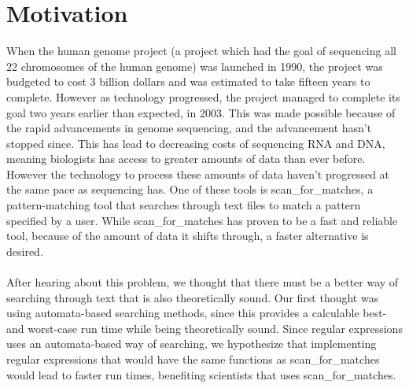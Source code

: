 \section{Motivation}
When the human genome project (a project which had the goal of sequencing 
all 22 chromosomes of the human genome) was launched in 1990, the project was 
budgeted to cost 3 billion dollars and was estimated to take fifteen years 
to complete. However as technology progressed, the project managed to complete 
its goal two years earlier than expected, in 2003. This was made possible 
because of the rapid advancements in genome sequencing, and the advancement 
hasn't stopped since. This has lead to decreasing costs of sequencing RNA and DNA, 
meaning biologists has access to greater amounts of data than ever before. 
However the technology to process these amounts of data haven't progressed at 
the same pace as sequencing has. One of these tools is scan\_for\_matches, a 
pattern-matching tool that searches through text files to match a pattern specified 
by a user. While scan\_for\_matches has proven to be a fast and reliable 
tool, because of the amount of data it shifts through, a faster alternative 
is desired.\\\\
After hearing about this problem, we thought that there must be a better 
way of searching through text that is also theoretically sound. Our first 
thought was using automata-based searching methods, since this provides a 
calculable best- and worst-case run time while being theoretically sound. 
Since regular expressions uses an automata-based way of searching, we hypothesize 
that implementing regular expressions that would have the same functions as 
scan\_for\_matches would lead to faster run times, benefiting scientists 
that uses scan\_for\_matches.

